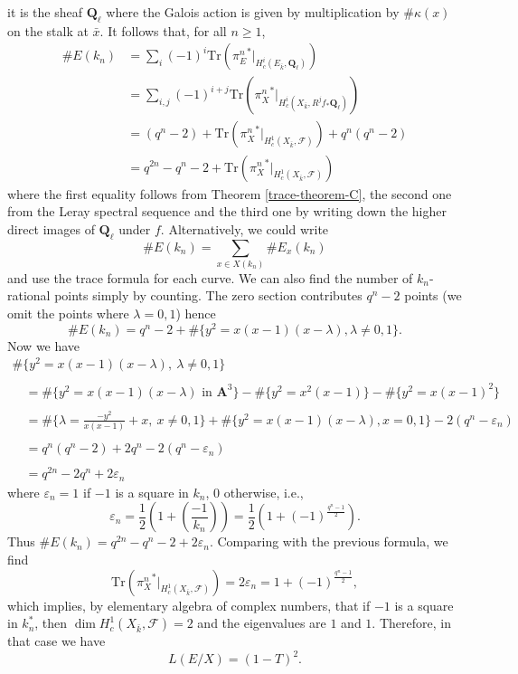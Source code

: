 it is the sheaf $\mathbf{Q}_\ell$ where the Galois action is given by
multiplication by $\#\kappa(x)$ on the stalk at $\bar x$. It follows that,
for all $n\geq 1$,
\begin{align*}
\# E(k_n)
& =
\sum\nolimits_i (-1)^i
\text{Tr}({\pi_E^n}^* |_{H_c^i(E_{\bar k}, \mathbf{Q}_\ell)}) \\
& =
\sum\nolimits_{i, j} (-1)^{i+j}
\text{Tr}({\pi^n_X}^* |_{H_c^i(X_{\bar k}, R^jf_*\mathbf{Q}_\ell)}) \\
& =
(q^n - 2) +
\text{Tr}({\pi_X^n}^* |_{H_c^1(X_{\bar k}, \mathcal{F})}) + q^n(q^n - 2) \\
& =
q^{2n} - q^n - 2 +
\text{Tr}({\pi_X^n}^* |_{H_c^1(X_{\bar k}, \mathcal{F})})
\end{align*}
where the first equality follows from
Theorem \ref{trace-theorem-C},
the second one from
the Leray spectral sequence and the third one by writing down the higher direct
images of $\mathbf{Q}_\ell$ under $f$. Alternatively, we could write
$$
\# E(k_n) = \sum_{x \in X(k_n)} \# E_x(k_n)
$$
and use the trace formula for each curve. We can also find the number of
$k_n$-rational points simply by counting. The zero section contributes $q^n -2$
points (we omit the points where $\lambda = 0, 1$) hence
$$
\# E(k_n) =
q^n - 2 + \# \{y^2 = x(x - 1)(x - \lambda), \lambda\neq 0, 1\}.
$$
Now we have
$$
\begin{matrix}
\# \{y^2 = x(x - 1)(x - \lambda),\ \lambda\neq 0, 1\} \\
\\
\quad =
\# \{y^2 = x(x - 1)(x - \lambda)\text{ in }\mathbf{A}^3\}
- \# \{y^2 = x^2(x - 1)\} - \# \{y^2 = x(x - 1)^2\}\\
\\
\quad = \# \{\lambda = \frac{-y^2}{x(x - 1)} + x,\ x\neq 0, 1\} +
\# \{y^2 = x(x - 1)(x - \lambda), x = 0, 1\} - 2(q^n - \varepsilon_n) \\
\\
\quad = q^n(q^n - 2)+2q^n - 2(q^n - \varepsilon_n)\\
\\
\quad = q^{2n}-2q^n+2\varepsilon_n
\end{matrix}
$$
where $\varepsilon_n = 1$ if $-1$ is a square in $k_n$, 0 otherwise,
i.e.,
$$
\varepsilon_n = \frac{1}{2}\left(1+\left(\frac{-1}{k_n}\right)\right) =
\frac{1}{2}\left(1+(-1)^{\frac{q^n - 1}{2}}\right).
$$
Thus $ \# E(k_n) = q^{2n} - q^n - 2+ 2\varepsilon_n$.
Comparing with the previous formula, we find
$$
\text{Tr}({\pi_X^n}^* |_{H_c^1(X_{\bar k}, \mathcal{F})}) =
2 \varepsilon_n = 1 + (-1)^{\frac{q^n - 1}{2}},
$$
which implies, by elementary algebra of complex numbers, that if $-1$ is a
square in $k_n^*$, then $\dim H_c^1(X_{\bar k}, \mathcal{F}) = 2$ and the
eigenvalues are $1$ and $1$. Therefore, in that case we have
$$
L(E/X) = (1 - T)^2.
$$

